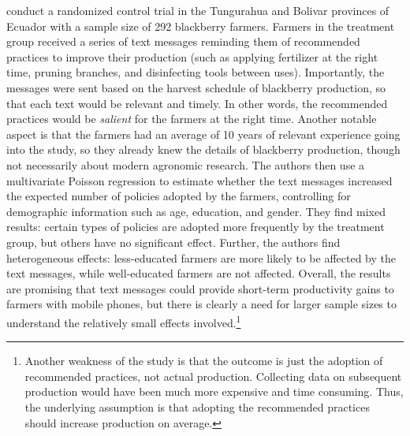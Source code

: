 \documentclass[12pt]{article}
\begin{document}
\textcite{carrion-yaguana_promoting_2020} conduct a randomized control trial in the Tungurahua and Bolivar provinces of Ecuador with a sample size of 292 blackberry farmers. Farmers in the treatment group received a series of text messages reminding them of recommended practices to improve their production (such as applying fertilizer at the right time, pruning branches, and disinfecting tools between uses). Importantly, the messages were sent based on the harvest schedule of blackberry production, so that each text would be relevant and timely. In other words, the recommended practices would be \textit{salient} for the farmers at the right time. Another notable aspect is that the farmers had an average of 10 years of relevant experience going into the study, so they already knew the details of blackberry production, though not necessarily about modern agronomic research. The authors then use a multivariate Poisson regression to estimate whether the text messages increased the expected number of policies adopted by the farmers, controlling for demographic information such as age, education, and gender. They find mixed results: certain types of policies are adopted more frequently by the treatment group, but others have no significant effect. Further, the authors find heterogeneous effects: less-educated farmers are more likely to be affected by the text messages, while well-educated farmers are not affected. Overall, the results are promising that text messages could provide short-term productivity gains to farmers with mobile phones, but there is clearly a need for larger sample sizes to understand the relatively small effects involved.\footnote{Another weakness of the study is that the outcome is just the adoption of recommended practices, not actual production. Collecting data on subsequent production would have been much more expensive and time consuming. Thus, the underlying assumption is that adopting the recommended practices should increase production on average.}
\end{document}

